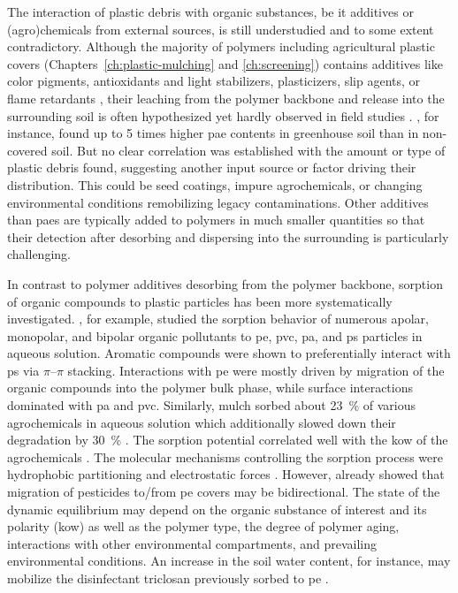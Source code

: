 The interaction of plastic debris with organic substances, be it additives or (agro)\-chemicals from external sources, is still understudied and to some extent contradictory.
Although the majority of polymers including agricultural plastic covers (Chapters~\ref{ch:plastic-mulching} and \ref{ch:screening}) contains additives like color pigments, antioxidants and light stabilizers, plasticizers, slip agents, or flame retardants \citep{HahladakisOverview2018}, their leaching from the polymer backbone and release into the surrounding soil is often hypothesized \citep[Chapter~\ref{ch:plastic-mulching};][]{PathanSoil2020,ZhangTransport2020} yet hardly observed in field studies \citep{QiBehavior2020}. , for instance, found up to \num{5} times higher \ac{pae} contents in greenhouse soil than in non-covered soil. But no clear correlation was established with the amount or type of plastic debris found, suggesting another input source or factor driving their distribution. This could be seed coatings, impure agrochemicals, or changing environmental conditions remobilizing legacy contaminations.
Other additives than \acp{pae} are typically added to polymers in much smaller quantities \citep{HahladakisOverview2018} so that their detection after desorbing and dispersing into the surrounding is particularly challenging.

In contrast to polymer additives desorbing from the polymer backbone, sorption of organic compounds to plastic particles has been more systematically investigated. , for example, studied the sorption behavior of numerous apolar, monopolar, and bipolar organic pollutants to \ac{pe}, \ac{pvc}, \ac{pa}, and \ac{ps} particles in aqueous solution. Aromatic compounds were shown to preferentially interact with \ac{ps} via $\pi$--$\pi$ stacking. Interactions with \ac{pe} were mostly driven by migration of the organic compounds into the polymer bulk phase, while surface interactions dominated with \ac{pa} and \ac{pvc}. Similarly,  mulch sorbed about \SI{23}{\percent} of various agrochemicals in aqueous solution which additionally slowed down their degradation by \SI{30}{\percent} \citep{BeriotLaboratory2020}. The sorption potential correlated well with the \ac{kow} of the agrochemicals \citep{BeriotLaboratory2020,WangAdsorption2020,SuntaAdsorption2020,LanComparative2021}. The molecular mechanisms controlling the sorption process were hydrophobic partitioning and electrostatic forces \citep{TourinhoPartitioning2019,LanComparative2021}.
However, \citet{RamosPolyethylene2015} already showed that migration of pesticides to\slash from \ac{pe} covers may be bidirectional. The state of the dynamic equilibrium may depend on the organic substance of interest and its polarity (\ac{kow}) as well as the polymer type, the degree of polymer aging, interactions with other environmental compartments, and prevailing environmental conditions. An increase in the soil water content, for instance, may mobilize the disinfectant triclosan previously sorbed to \ac{pe} \citep{ChenComparison2021}.

